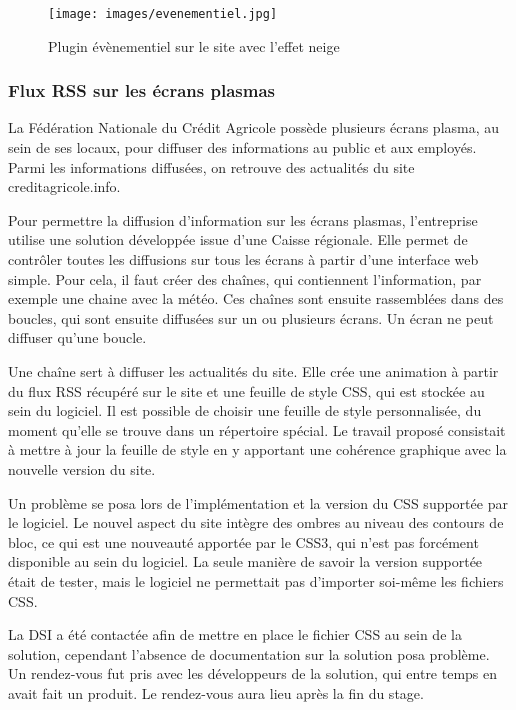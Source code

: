 \documentclass[12pt,a4paper]{article}
\begin{document}
\begin{figure}[h!]
\centering
\texttt{[image: images/evenementiel.jpg]}
\caption{Plugin évènementiel sur le site avec l'effet neige}
\end{figure}

\subsubsection{Flux RSS sur les écrans plasmas}
La Fédération Nationale du Crédit Agricole possède plusieurs écrans plasma, au sein de ses locaux, pour diffuser des informations au public et aux employés. Parmi les informations diffusées, on retrouve des actualités du site creditagricole.info.\par 
Pour permettre la diffusion d'information sur les écrans plasmas, l'entreprise utilise une solution développée issue d'une Caisse régionale. Elle permet de contrôler toutes les diffusions sur tous les écrans à partir d'une interface web simple. Pour cela, il faut créer des chaînes, qui contiennent l'information, par exemple une chaine avec la météo. Ces chaînes sont ensuite rassemblées dans des boucles, qui sont ensuite diffusées sur un ou plusieurs écrans. Un écran ne peut diffuser qu'une boucle.\par 
Une chaîne sert à diffuser les actualités du site. Elle crée une animation à partir du flux RSS récupéré sur le site et une feuille de style \gls{CSS}, qui est stockée au sein du logiciel. Il est possible de choisir une feuille de style personnalisée, du moment qu'elle se trouve dans un répertoire spécial. Le travail proposé consistait à mettre à jour la feuille de style en y apportant une cohérence graphique avec la nouvelle version du site.\par 
Un problème se posa lors de l’implémentation et la version du \gls{CSS} supportée par le logiciel. Le nouvel aspect du site intègre des ombres au niveau des contours de bloc, ce qui est une nouveauté apportée par le \gls{CSS}3, qui n'est pas forcément disponible au sein du logiciel. La seule manière de savoir la version supportée était de tester, mais le logiciel ne permettait pas d'importer soi-même les fichiers \gls{CSS}.\par 
La DSI a été contactée afin de mettre en place le fichier \gls{CSS} au sein de la solution, cependant l'absence de documentation sur la solution posa problème. Un rendez-vous fut pris avec les développeurs de la solution, qui entre temps en avait fait un produit. Le rendez-vous aura lieu après la fin du stage.\par
\end{document}
